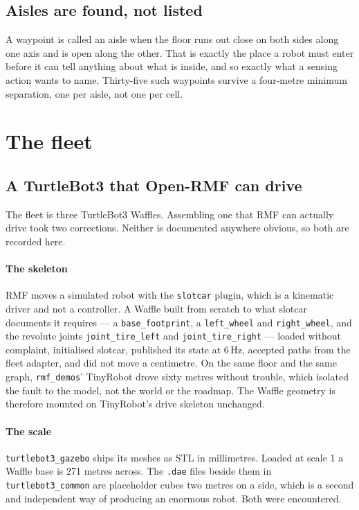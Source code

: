 \documentclass[11pt,a4paper]{article}
\theoremstyle{definition}
\newcommand{\code}[1]{\texttt{\small #1}}
\begin{document}
\subsection{Aisles are found, not listed}

A waypoint is called an aisle when the floor runs out close on both sides along
one axis and is open along the other. That is exactly the place a robot must
enter before it can tell anything about what is inside, and so exactly what a
sensing action wants to name. Thirty-five such waypoints survive a four-metre
minimum separation, one per aisle, not one per cell.

\section{The fleet}

\subsection{A TurtleBot3 that Open-RMF can drive}

The fleet is three TurtleBot3 Waffles. Assembling one that RMF can actually
drive took two corrections. Neither is documented anywhere obvious, so both are recorded here.

\paragraph{The skeleton} RMF moves a simulated robot with the \code{slotcar}
plugin, which is a kinematic driver and not a controller. A Waffle built
from scratch to what slotcar documents it requires --- a \code{base\_footprint},
a \code{left\_wheel} and \code{right\_wheel}, and the revolute joints
\code{joint\_tire\_left} and \code{joint\_tire\_right} --- loaded without
complaint, initialised slotcar, published its state at 6\,Hz, accepted paths
from the fleet adapter, and did not move a centimetre. On the same floor and
the same graph, \code{rmf\_demos}' TinyRobot drove sixty metres without
trouble, which isolated the fault to the model, not the world or the roadmap. The Waffle geometry is therefore mounted on TinyRobot's drive
skeleton unchanged.

\paragraph{The scale} \code{turtlebot3\_gazebo} ships its meshes as STL in
millimetres. Loaded at scale 1 a Waffle base is 271 metres across. The
\code{.dae} files beside them in \code{turtlebot3\_common} are placeholder
cubes two metres on a side, which is a second and independent way of producing
an enormous robot. Both were encountered.
\end{document}
